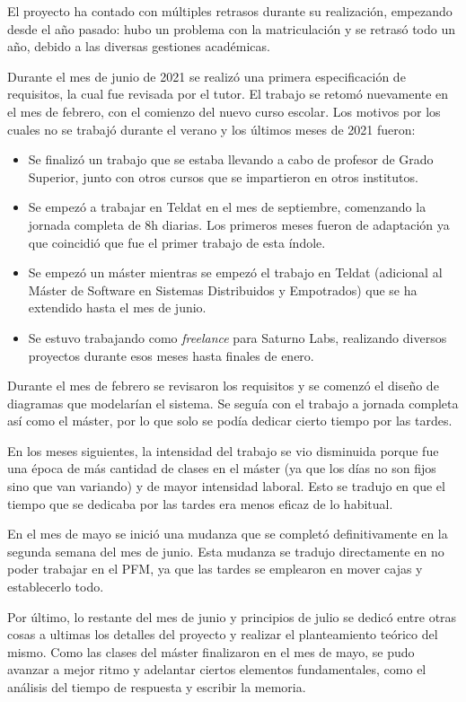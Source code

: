 El proyecto ha contado con múltiples retrasos durante su realización, empezando
desde el año pasado: hubo un problema con la matriculación y se retrasó todo
un año, debido a las diversas gestiones académicas.

Durante el mes de junio de 2021 se realizó una primera especificación de
requisitos, la cual fue revisada por el tutor. El trabajo se retomó nuevamente
en el mes de febrero, con el comienzo del nuevo curso escolar. Los
motivos por los cuales no se trabajó durante el verano y los últimos meses de 2021 fueron:

\begin{itemize}
  \item Se finalizó un trabajo que se estaba llevando a cabo de profesor de Grado Superior,
        junto con otros cursos que se impartieron en otros institutos.
  \item Se empezó a trabajar en Teldat en el mes de septiembre, comenzando la jornada
        completa de 8h diarias. Los primeros meses fueron de adaptación ya que coincidió
        que fue el primer trabajo de esta índole.
  \item Se empezó un máster mientras se empezó el trabajo en Teldat (adicional al
        Máster de Software en Sistemas Distribuidos y Empotrados) que se ha extendido
        hasta el mes de junio.
  \item Se estuvo trabajando como \textit{freelance} para Saturno Labs, realizando
        diversos proyectos durante esos meses hasta finales de enero.
\end{itemize}

Durante el mes de febrero se revisaron los requisitos y se comenzó el diseño de diagramas
que modelarían el sistema. Se seguía con el trabajo a jornada completa así como el
máster, por lo que solo se podía dedicar cierto tiempo por las tardes.

En los meses siguientes, la intensidad del trabajo se vio disminuida porque fue una
época de más cantidad de clases en el máster (ya que los días no son fijos sino
que van variando) y de mayor intensidad laboral. Esto se tradujo en que el tiempo
que se dedicaba por las tardes era menos eficaz de lo habitual.

En el mes de mayo se inició una mudanza que se completó definitivamente en la
segunda semana del mes de junio. Esta mudanza se tradujo directamente en no poder
trabajar en el PFM, ya que las tardes se emplearon en mover cajas y establecerlo
todo.

Por último, lo restante del mes de junio y principios de julio se dedicó entre otras
cosas a ultimas los detalles del proyecto y realizar el planteamiento teórico del mismo.
Como las clases del máster finalizaron en el mes de mayo, se pudo avanzar a mejor
ritmo y adelantar ciertos elementos fundamentales, como el análisis del tiempo de
respuesta y escribir la memoria.

